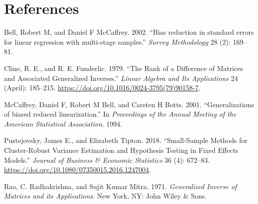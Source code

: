 \documentclass[12pt]{article}
\newlength{\cslhangindent}
\newlength{\cslentryspacingunit} %
\newenvironment{CSLReferences}[2] %
 {%
  \setlength{\parindent}{0pt}
  \ifodd #1
  \let\oldpar\par
  \def\par{\hangindent=\cslhangindent\oldpar}
  \fi
  \setlength{\parskip}{#2\cslentryspacingunit}
 }%
 {}
\begin{document}
\hypertarget{references}{%
\section*{References}\label{references}}

\hypertarget{refs}{}
\begin{CSLReferences}{1}{0}
\leavevmode{}%
Bell, Robert M, and Daniel F McCaffrey. 2002. {``{Bias reduction in
standard errors for linear regression with multi-stage samples}.''}
\emph{Survey Methodology} 28 (2): 169--81.

\leavevmode{}%
Cline, R. E., and R. E. Funderlic. 1979. {``The Rank of a Difference of
Matrices and Associated Generalized Inverses.''} \emph{Linear Algebra
and Its Applications} 24 (April): 185--215.
\url{https://doi.org/10.1016/0024-3795(79)90158-7}.

\leavevmode{}%
McCaffrey, Daniel F, Robert M Bell, and Carsten H Botts. 2001.
{``{Generalizations of biased reduced linearization}.''} In
\emph{Proceedings of the Annual Meeting of the American Statistical
Association}. 1994.

\leavevmode{}%
Pustejovsky, James E., and Elizabeth Tipton. 2018. {``Small-Sample
Methods for Cluster-Robust Variance Estimation and Hypothesis Testing in
Fixed Effects Models.''} \emph{Journal of Business \& Economic
Statistics} 36 (4): 672--83.
\url{https://doi.org/10.1080/07350015.2016.1247004}.

\leavevmode{}%
Rao, C. Radhakrishna, and Sujit Kumar Mitra. 1971. \emph{{Generalized
Inverse of Matrices and its Applications}}. New York, NY: John Wiley \&
Sons.

\end{CSLReferences}



\end{document}
